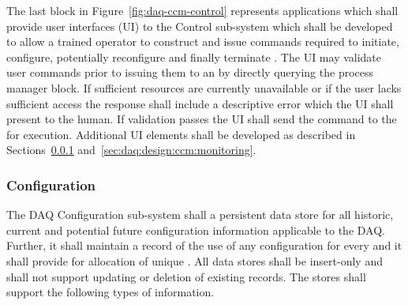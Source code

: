 The last block in Figure~\ref{fig:daq-ccm-control} represents applications which shall provide user interfaces (UI) to the Control sub-system which shall be developed to allow a trained operator to construct and issue commands required to initiate, configure, potentially reconfigure and finally terminate . 
The UI may validate user commands prior to issuing them to an  by directly querying the process manager block. 
If sufficient resources are currently unavailable or if the user lacks sufficient access the response shall include a descriptive error which the UI shall present to the human.
If validation passes the UI shall send the command to the  for execution. 
Additional UI elements shall be developed as described in Sections~\ref{sec:daq:design:ccm:configuration} and~\ref{sec:daq:design:ccm:monitoring}.


\subsubsection{Configuration}
\label{sec:daq:design:ccm:configuration}

The DAQ Configuration sub-system shall a persistent data store for all historic, current and potential future configuration information applicable to the DAQ.
Further, it shall maintain a record of the use of any configuration for every  and it shall provide for allocation of unique . 
All data stores shall be insert-only and shall not support updating or deletion of existing records.
The stores shall support the following types of information.

